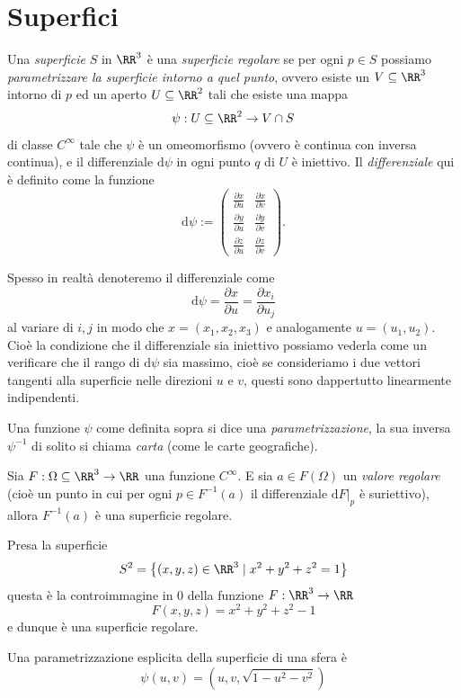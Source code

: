 \documentclass[11pt]{scrartcl}
\newcommand{\dif}{\text{d}}
\begin{document}
	\newpage
	
	\section{Superfici}
	
	\begin{definition}
		Una \textit{superficie} $S$ in $\RR^3$ è una \textit{superficie regolare} se per ogni $p\in S$ possiamo \textit{parametrizzare la superficie intorno a quel punto}, ovvero esiste un $V\subseteq\RR^3$ intorno di $p$ ed un aperto $U\subseteq \RR^2$ tali che esiste una mappa 
		$$\psi:U\subseteq\RR^2\to V\cap S$$
		di classe $C^\infty$ tale che $\psi$ è un omeomorfismo (ovvero è continua con inversa continua), e il differenziale $\dif\psi$ in ogni punto $q$ di $U$ è iniettivo. Il \textit{differenziale} qui è definito come la funzione
		$$\dif\psi:=\begin{pmatrix}
			\frac{\partial x}{\partial u} &  \frac{\partial x}{\partial v}\\
			\frac{\partial y}{\partial u} &  \frac{\partial y}{\partial v}\\
			\frac{\partial z}{\partial u} &  \frac{\partial z}{\partial v}
		\end{pmatrix}.$$ 
	\end{definition}
	Spesso in realtà denoteremo il differenziale come
	$$\dif\psi =\frac{\partial x}{\partial u}=\frac{\partial x_i}{\partial u_j}$$
	al variare di $i,j$ in modo che $x=(x_1,x_2,x_3)$ e analogamente $u=(u_1,u_2)$. Cioè la condizione che il differenziale sia iniettivo possiamo vederla come un verificare che il rango di $\dif\psi$ sia massimo, cioè se consideriamo i due vettori tangenti alla superficie nelle direzioni $u$ e $v$, questi sono dappertutto linearmente indipendenti.
	\begin{definition}
		Una funzione $\psi$ come definita sopra si dice una \textit{parametrizzazione}, la sua inversa $\psi^{-1}$ di solito si chiama \textit{carta} (come le carte geografiche).
	\end{definition}
	\begin{proposition}
		Sia $F:\Omega\subseteq\RR^3 \to \RR$ una funzione $C^\infty$. E sia $a\in F(\Omega)$ un \textit{valore regolare} (cioè un punto in cui per ogni $p\in F^{-1}(a)$ il differenziale $\dif F|_p$ è suriettivo), allora $F^{-1}(a)$ è una superficie regolare. 
	\end{proposition}
	\begin{example}[Sfera]
		Presa la superficie 
		$$S^2=\left\{\left(x,y,z\right)\in\RR^3\mid x^2+y^2+z^2=1\right\}$$
		questa è la controimmagine in $0$ della funzione $F:\RR^3\to\RR$
		$$F(x,y,z)=x^2+y^2+z^2-1$$
		e dunque è una superficie regolare.
	\end{example}
	Una parametrizzazione esplicita della superficie di una sfera è
	$$\psi(u,v)=\left(u,v,\sqrt{1-u^2-v^2}\right)$$
	
\end{document}
